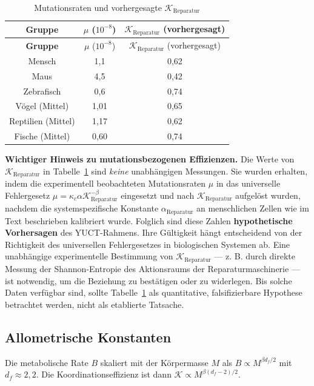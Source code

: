 \documentclass[12pt,a4paper]{article}
\newcommand{\REL}{\mathcal{K}}          %
\begin{document}
	\begin{longtable}{|c|c|c|}
		\caption{Mutationsraten und vorhergesagte \(\REL_{\mathrm{Reparatur}}\)}\label{tab:mutations}\\
		\hline
		\textbf{Gruppe} & \(\mu\) (\(10^{-8}\)) & \(\REL_{\mathrm{Reparatur}}\) (vorhergesagt) \\
		\hline
		\endfirsthead
		\hline
		\textbf{Gruppe} & \(\mu\) (\(10^{-8}\)) & \(\REL_{\mathrm{Reparatur}}\) (vorhergesagt) \\
		\hline
		\endhead
		\hline
		Mensch & 1,1 & 0,62 \\
		Maus & 4,5 & 0,42 \\
		Zebrafisch & 0,6 & 0,74 \\
		Vögel (Mittel) & 1,01 & 0,65 \\
		Reptilien (Mittel) & 1,17 & 0,62 \\
		Fische (Mittel) & 0,60 & 0,74 \\
		\hline
	\end{longtable}
	
	\noindent\textbf{Wichtiger Hinweis zu mutationsbezogenen Effizienzen.}
	Die Werte von \(\REL_{\mathrm{Reparatur}}\) in Tabelle~\ref{tab:mutations} sind \emph{keine} unabhängigen Messungen.
	Sie wurden erhalten, indem die experimentell beobachteten Mutationsraten \(\mu\) in das universelle Fehlergesetz \(\mu = \kappa_c \alpha \REL_{\mathrm{Reparatur}}^{-\beta}\) eingesetzt und nach \(\REL_{\mathrm{Reparatur}}\) aufgelöst wurden, nachdem die systemspezifische Konstante \(\alpha_{\mathrm{Reparatur}}\) an menschlichen Zellen wie im Text beschrieben kalibriert wurde.
	Folglich sind diese Zahlen \textbf{hypothetische Vorhersagen} des YUCT-Rahmens.
	Ihre Gültigkeit hängt entscheidend von der Richtigkeit des universellen Fehlergesetzes in biologischen Systemen ab.
	Eine unabhängige experimentelle Bestimmung von \(\REL_{\mathrm{Reparatur}}\) — z. B. durch direkte Messung der Shannon-Entropie des Aktionsraums der Reparaturmaschinerie — ist notwendig, um die Beziehung zu bestätigen oder zu widerlegen.
	Bis solche Daten verfügbar sind, sollte Tabelle~\ref{tab:mutations} als quantitative, falsifizierbare Hypothese betrachtet werden, nicht als etablierte Tatsache.
	
	\subsection{Allometrische Konstanten}
	\label{sec:allometry}
	Die metabolische Rate \(B\) skaliert mit der Körpermasse \(M\) als \(B\propto M^{\beta d_f/2}\) mit \(d_f\approx2,2\). Die Koordinationseffizienz ist dann \(\REL \propto M^{\beta(d_f-2)/2}\).
	
\end{document}
